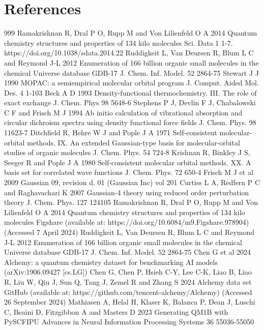 \documentclass[12pt]{article}
\begin{document}
\section*{References}
\begin{thebibliography}{999}
 Ramakrishnan R, Dral P O, Rupp M and Von Lilienfeld O A 2014 Quantum chemistry structures and properties of 134 kilo molecules Sci. Data 1 1-7. https://doi.org/10.1038/sdata.2014.22
 Ruddigkeit L, Van Deursen R, Blum L C and Reymond J-L 2012 Enumeration of 166 billion organic small molecules in the chemical Universe database GDB-17 J. Chem. Inf. Model. 52 2864-75
 Stewart J J 1990 MOPAC: a semiempirical molecular orbital program J. Comput. Aided Mol. Des. 4 1-103
 Beck A D 1993 Density-functional thermochemistry. III. The role of exact exchange J. Chem. Phys 98 5648-6
 Stephens P J, Devlin F J, Chabalowski C F and Frisch M J 1994 Ab initio calculation of vibrational absorption and circular dichroism spectra using density functional force fields J. Chem. Phys. 98 11623-7
 Ditchfield R, Hehre W J and Pople J A 1971 Self-consistent molecular-orbital methods. IX. An extended Gaussian-type basis for molecular-orbital studies of organic molecules J. Chem. Phys. 54 724-8
 Krishnan R, Binkley J S, Seeger R and Pople J A 1980 Self-consistent molecular orbital methods. XX. A basis set for correlated wave functions J. Chem. Phys. 72 650-4
 Frisch M J et al 2009 Gaussian 09, revision d. 01 (Gaussian Inc) vol 201
 Curtiss L A, Redfern P C and Raghavachari K 2007 Gaussian-4 theory using reduced order perturbation theory J. Chem. Phys. 127 124105
 Ramakrishnan R, Dral P O, Rupp M and Von Lilienfeld O A 2014 Quantum chemistry structures and properties of 134 kilo molecules Figshare (available at: https://doi.org/10.6084/m9.Figshare.978904) (Accessed 7 April 2024)
 Ruddigkeit L, Van Deursen R, Blum L C and Reymond J-L 2012 Enumeration of 166 billion organic small molecules in the chemical Universe database GDB-17 J. Chem. Inf. Model. 52 2864-75
 Chen G et al 2024 Alchemy: a quantum chemistry dataset for benchmarking AI models (arXiv:1906.09427 [cs.LG])
 Chen G, Chen P, Hsieh C-Y, Lee C-K, Liao B, Liao R, Liu W, Qiu J, Sun Q, Tang J, Zemel R and Zhang S 2024 Alchemy data set GitHub (available at: https://github.com/tencent-alchemy/Alchemy) (Accessed 26 September 2024)
 Mathiasen A, Helal H, Klaser K, Balanca P, Dean J, Luschi C, Beaini D, Fitzgibbon A and Masters D 2023 Generating QM1B with PySCFIPU Advances in Neural Information Processing Systems 36 55036-55050

\end{thebibliography}
\end{document}
